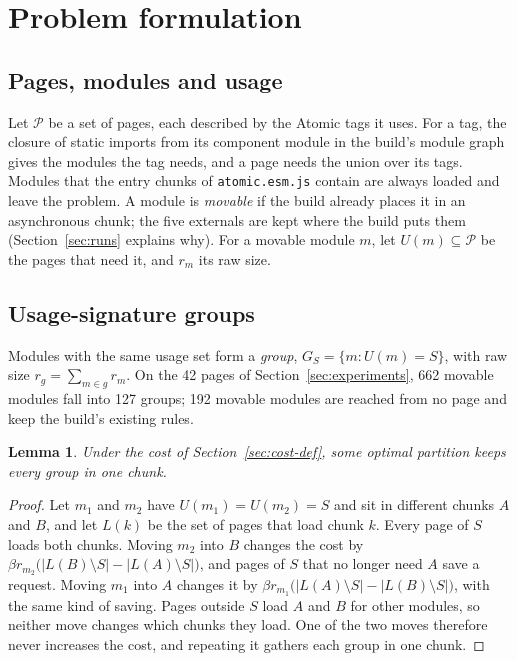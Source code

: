 \documentclass[11pt]{article}
\newtheorem{lemma}{Lemma}
\newcommand{\code}[1]{\texttt{#1}}
\begin{document}
\section{Problem formulation}\label{sec:formulation}

\subsection{Pages, modules and usage}
Let $\mathcal{P}$ be a set of pages, each described by the Atomic tags it uses. For a tag, the closure of static imports from its component module in the build's module graph gives the modules the tag needs, and a page needs the union over its tags. Modules that the entry chunks of \code{atomic.esm.js} contain are always loaded and leave the problem. A module is \emph{movable} if the build already places it in an asynchronous chunk; the five externals are kept where the build puts them (Section~\ref{sec:runs} explains why). For a movable module $m$, let $U(m) \subseteq \mathcal{P}$ be the pages that need it, and $r_m$ its raw size.

\subsection{Usage-signature groups}
Modules with the same usage set form a \emph{group}, $G_S = \{m : U(m) = S\}$, with raw size $r_g = \sum_{m \in g} r_m$. On the 42 pages of Section~\ref{sec:experiments}, 662 movable modules fall into 127 groups; 192 movable modules are reached from no page and keep the build's existing rules.

\begin{lemma}\label{lem:groups}
Under the cost of Section~\ref{sec:cost-def}, some optimal partition keeps every group in one chunk.
\end{lemma}
\begin{proof}
Let $m_1$ and $m_2$ have $U(m_1) = U(m_2) = S$ and sit in different chunks $A$ and $B$, and let $L(k)$ be the set of pages that load chunk $k$. Every page of $S$ loads both chunks. Moving $m_2$ into $B$ changes the cost by $\beta r_{m_2} \bigl(|L(B) \setminus S| - |L(A) \setminus S|\bigr)$, and pages of $S$ that no longer need $A$ save a request. Moving $m_1$ into $A$ changes it by $\beta r_{m_1} \bigl(|L(A) \setminus S| - |L(B) \setminus S|\bigr)$, with the same kind of saving. Pages outside $S$ load $A$ and $B$ for other modules, so neither move changes which chunks they load. One of the two moves therefore never increases the cost, and repeating it gathers each group in one chunk.
\end{proof}
\end{document}
